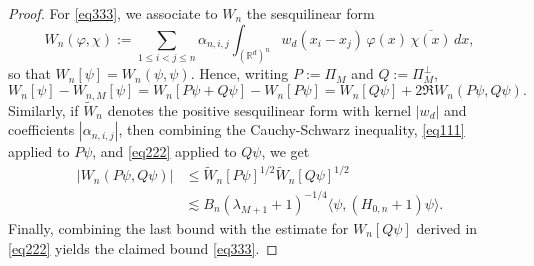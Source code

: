 \documentclass[10pt,a4paper]{amsart}
\newcommand{\R}{\mathbb{R}}
\begin{document}
\begin{proof}
For \eqref{eq333}, we associate to \(W_n\) the sesquilinear form
\[
W_n(\varphi,\chi)
:=
\sum_{1\le i<j\le n}
\alpha_{n,i,j}\int_{(\R^d)^n}w_d(x_i-x_j)\,\varphi(x)\,\overline{\chi(x)}\,dx,
\]
so that \(W_n[\psi]=W_n(\psi,\psi)\). Hence, writing \(P:=\Pi_M\) and \(Q:=\Pi_M^\perp\),
\[
W_n[\psi]-W_{n,M}[\psi]
=
W_n[P\psi+Q\psi]-W_n[P\psi]
=
W_n[Q\psi]+2\Re W_n(P\psi,Q\psi).
\]
Similarly, if \(\widetilde W_n\) denotes the positive sesquilinear form with kernel
\(|w_d|\) and coefficients \(|\alpha_{n,i,j}|\), then combining the Cauchy-Schwarz inequality, \eqref{eq111} applied to \(P\psi\), and \eqref{eq222} applied to \(Q\psi\), we get
\begin{align}
|W_n(P\psi,Q\psi)|&\le \widetilde{W}_n[P\psi]^{1/2}\widetilde{W}_n[Q\psi]^{1/2}\nonumber\\
&\lesssim B_n(\lambda_{M+1}+1)^{-1/4}\langle \psi,(H_{0,n}+1)\psi\rangle.\nonumber
\end{align}
Finally, combining the last bound with the estimate for \(W_n[Q\psi]\) derived in \eqref{eq222} yields the claimed bound \eqref{eq333}.
\end{proof}
\end{document}

